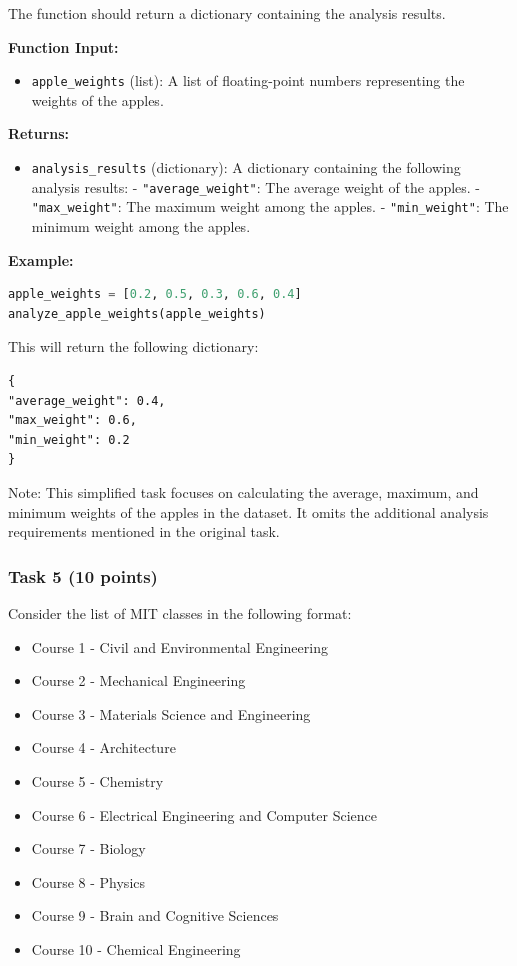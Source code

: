 \documentclass[12pt]{book}
\begin{document}
The function should return a dictionary containing the analysis results.

\textbf{Function Input:}
\begin{itemize}
\item \texttt{apple\_weights} (list): A list of floating-point numbers representing the weights of the apples.
\end{itemize}

\textbf{Returns:}
\begin{itemize}
\item \texttt{analysis\_results} (dictionary): A dictionary containing the following analysis results:
- \texttt{"average\_weight"}: The average weight of the apples.
- \texttt{"max\_weight"}: The maximum weight among the apples.
- \texttt{"min\_weight"}: The minimum weight among the apples.
\end{itemize}

\textbf{Example:}
\begin{lstlisting}[language=Python]
apple_weights = [0.2, 0.5, 0.3, 0.6, 0.4]
analyze_apple_weights(apple_weights)
\end{lstlisting}
This will return the following dictionary:
\begin{verbatim}
{
"average_weight": 0.4,
"max_weight": 0.6,
"min_weight": 0.2
}
\end{verbatim}

Note: This simplified task focuses on calculating the average, maximum, and minimum weights of the apples in the dataset. It omits the additional analysis requirements mentioned in the original task.

\subsubsection{Task 5 (10 points)}
Consider the list of MIT classes in the following format:

\begin{itemize}
\item Course 1 - Civil and Environmental Engineering
\item Course 2 - Mechanical Engineering
\item Course 3 - Materials Science and Engineering
\item Course 4 - Architecture
\item Course 5 - Chemistry
\item Course 6 - Electrical Engineering and Computer Science
\item Course 7 - Biology
\item Course 8 - Physics
\item Course 9 - Brain and Cognitive Sciences
\item Course 10 - Chemical Engineering
\end{itemize}
\end{document}
